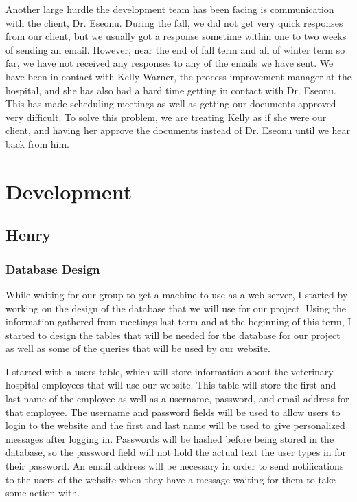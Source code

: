 \documentclass[onecolumn, draftclsnofoot,10pt, compsoc]{IEEEtran}
\begin{document}
Another large hurdle the development team has been facing is communication with the client, Dr. Eseonu. During the fall, we did not get very quick responses from our client, but we usually got a response sometime within one to two weeks of sending an email. However, near the end of fall term and all of winter term so far, we have not received any responses to any of the emails we have sent. We have been in contact with Kelly Warner, the process improvement manager at the hospital, and she has also had a hard time getting in contact with Dr. Eseonu. This has made scheduling meetings as well as getting our documents approved very difficult. To solve this problem, we are treating Kelly as if she were our client, and having her approve the documents instead of Dr. Eseonu until we hear back from him. 


\section{Development}

\subsection{Henry}

\subsubsection{Database Design}
While waiting for our group to get a machine to use as a web server, I started by working on the design of the database that we will use for our project. Using the information gathered from meetings last term and at the beginning of this term, I started to design the tables that will be needed for the database for our project as well as some of the queries that will be used by our website. 

I started with a users table, which will store information about the veterinary hospital employees that will use our website. This table will store the first and last name of the employee as well as a username, password, and email address for that employee. The username and password fields will be used to allow users to login to the website and the first and last name will be used to give personalized messages after logging in. Passwords will be hashed before being stored in the database, so the password field will not hold the actual text the user types in for their password. An email address will be necessary in order to send notifications to the users of the website when they have a message waiting for them to take some action with.
\end{document}
